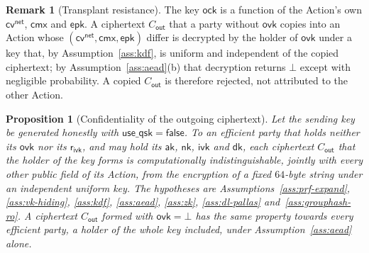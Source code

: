 \documentclass[11pt,a4paper]{article}
\newtheorem{proposition}[theorem]{Proposition}
\theoremstyle{definition}
\newtheorem{remark}[theorem]{Remark}
\newcommand{\cmx}{\mathsf{cmx}}
\newcommand{\cvsym}{\mathsf{cv}}
\newcommand{\aksym}{\ensuremath{\mathsf{ak}}}
\newcommand{\nksym}{\ensuremath{\mathsf{nk}}}
\newcommand{\ivk}{\ensuremath{\mathsf{ivk}}}
\newcommand{\ovk}{\ensuremath{\mathsf{ovk}}}
\newcommand{\dk}{\ensuremath{\mathsf{dk}}}
\newcommand{\rivk}{\ensuremath{\mathsf{r_{ivk}}}}
\begin{document}
\begin{remark}[Transplant resistance]
The key $\mathsf{ock}$ is a function of the Action's own
$\cvsym^{\mathsf{net}}$, $\cmx$ and $\mathsf{epk}$. A ciphertext
$C_{\mathsf{out}}$ that a party without $\ovk$ copies into an Action whose
$(\cvsym^{\mathsf{net}}, \cmx, \mathsf{epk})$ differ is decrypted by the
holder of $\ovk$ under a key that, by Assumption~\ref{ass:kdf}, is uniform
and independent of the copied ciphertext; by Assumption~\ref{ass:aead}(b)
that decryption returns $\bot$ except with negligible probability. A copied
$C_{\mathsf{out}}$ is therefore rejected, not attributed to the other
Action.
\end{remark}

\begin{proposition}[Confidentiality of the outgoing ciphertext]
Let the sending key be generated honestly with
$\mathsf{use\_qsk} = \mathsf{false}$. To an efficient party that holds
neither its $\ovk$ nor its $\rivk$, and may hold its $\aksym$, $\nksym$,
$\ivk$ and $\dk$, each ciphertext $C_{\mathsf{out}}$ that the holder of the
key forms is computationally indistinguishable, jointly with every other
public field of its Action, from the encryption of a fixed $64$-byte string
under an independent uniform key. The hypotheses are
Assumptions~\ref{ass:prf-expand}, \ref{ass:vk-hiding}, \ref{ass:kdf},
\ref{ass:aead}, \ref{ass:zk}, \ref{ass:dl-pallas}
and~\ref{ass:grouphash-ro}. A ciphertext $C_{\mathsf{out}}$ formed with
$\ovk = \bot$ has the same property towards every efficient party, a holder
of the whole key included, under Assumption~\ref{ass:aead} alone.
\end{proposition}
\end{document}
